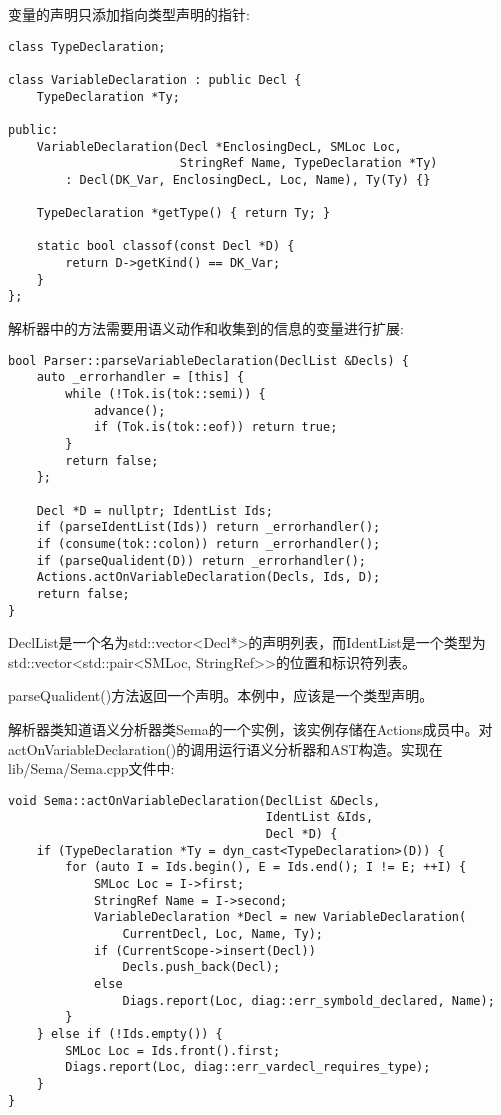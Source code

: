 变量的声明只添加指向类型声明的指针:\par

\begin{lstlisting}[caption={}]
class TypeDeclaration;

class VariableDeclaration : public Decl {
	TypeDeclaration *Ty;
	
public:
	VariableDeclaration(Decl *EnclosingDecL, SMLoc Loc,
						StringRef Name, TypeDeclaration *Ty)
		: Decl(DK_Var, EnclosingDecL, Loc, Name), Ty(Ty) {}
	
	TypeDeclaration *getType() { return Ty; }
	
	static bool classof(const Decl *D) {
		return D->getKind() == DK_Var;
	}
};
\end{lstlisting}

解析器中的方法需要用语义动作和收集到的信息的变量进行扩展:\par

\begin{lstlisting}[caption={}]
bool Parser::parseVariableDeclaration(DeclList &Decls) {
	auto _errorhandler = [this] {
		while (!Tok.is(tok::semi)) {
			advance();
			if (Tok.is(tok::eof)) return true;
		}
		return false;
	};

	Decl *D = nullptr; IdentList Ids;
	if (parseIdentList(Ids)) return _errorhandler();
	if (consume(tok::colon)) return _errorhandler();
	if (parseQualident(D)) return _errorhandler();
	Actions.actOnVariableDeclaration(Decls, Ids, D);
	return false;
}
\end{lstlisting}

DeclList是一个名为std::vector<Decl*>的声明列表，而IdentList是一个类型为std::vector<std::pair<SMLoc, StringRef>>的位置和标识符列表。\par

parseQualident()方法返回一个声明。本例中，应该是一个类型声明。\par

解析器类知道语义分析器类Sema的一个实例，该实例存储在Actions成员中。对actOnVariableDeclaration()的调用运行语义分析器和AST构造。实现在lib/Sema/Sema.cpp文件中:\par

\begin{lstlisting}[caption={}]
void Sema::actOnVariableDeclaration(DeclList &Decls,
									IdentList &Ids,
									Decl *D) {
	if (TypeDeclaration *Ty = dyn_cast<TypeDeclaration>(D)) {
		for (auto I = Ids.begin(), E = Ids.end(); I != E; ++I) {
			SMLoc Loc = I->first;
			StringRef Name = I->second;
			VariableDeclaration *Decl = new VariableDeclaration(
				CurrentDecl, Loc, Name, Ty);
			if (CurrentScope->insert(Decl))
				Decls.push_back(Decl);
			else
				Diags.report(Loc, diag::err_symbold_declared, Name);
		}
	} else if (!Ids.empty()) {
		SMLoc Loc = Ids.front().first;
		Diags.report(Loc, diag::err_vardecl_requires_type);
	}
}
\end{lstlisting}

